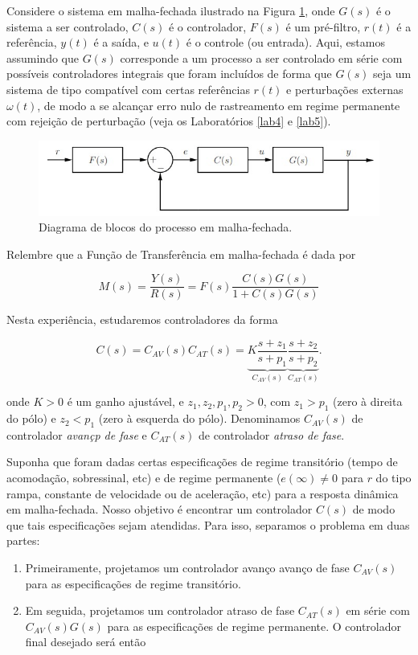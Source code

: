 \documentclass[
]{book}
\providecommand{\tightlist}{%
  \setlength{\itemsep}{0pt}\setlength{\parskip}{0pt}}
\theoremstyle{definition}
\theoremstyle{definition}
\theoremstyle{definition}
\theoremstyle{remark}
\begin{document}
Considere o sistema em malha-fechada ilustrado na Figura \ref{fig:fig9A1}, onde \(G(s)\) é o sistema a ser controlado, \(C(s)\) é o controlador, \(F(s)\) é um pré-filtro, \(r(t)\) é a referência, \(y(t)\) é a saída, e \(u(t)\) é o controle (ou entrada). Aqui, estamos assumindo que \(G(s)\) corresponde a um processo a ser controlado em série com possíveis controladores integrais que foram incluídos de forma que \(G(s)\) seja um sistema de tipo compatível com certas referências \(r(t)\) e perturbações externas \(\omega (t)\), de modo a se alcançar erro nulo de rastreamento em regime permanente com rejeição de perturbação (veja os Laboratórios \ref{lab4} e \ref{lab5}).

\begin{figure}

{\centering \includegraphics[width=0.5\linewidth]{Imagens/Lab9/Apresentação/fig1} 

}

\caption{Diagrama de blocos do processo em malha-fechada.}\label{fig:fig9A1}
\end{figure}

Relembre que a Função de Transferência em malha-fechada é dada por

\[
M(s) = \frac{Y(s)}{R(s)} = F(s)\frac{C(s)G(s)}{1+C(s)G(s)}
\]

Nesta experiência, estudaremos controladores da forma

\[
C(s) = C_{AV}(s)C_{AT}(s) = \underbrace{K\frac{s+z_1}{s+p_1}}_{C_{AV}(s)} \underbrace{\frac{s+z_2}{s+p_2}}_{C_{AT}(s)}.
\]

onde \(K>0\) é um ganho ajustável, e \(z_1,z_2,p_1,p_2 >0\), com \(z_1>p_1\) (zero à direita do pólo) e \(z_2<p_1\) (zero à esquerda do pólo). Denominamos \(C_{AV}(s)\) de controlador \emph{avançp de fase} e \(C_{AT}(s)\) de controlador \emph{atraso de fase}.

Suponha que foram dadas certas especificações de regime transitório (tempo de acomodação, sobressinal, etc) e de regime permanente (\(e(\infty) \neq 0\) para \(r\) do tipo rampa, constante de velocidade ou de aceleração, etc) para a resposta dinâmica em malha-fechada. Nosso objetivo é encontrar um controlador \(C(s)\) de modo que tais especificações sejam atendidas. Para isso, separamos o problema em duas partes:

\begin{enumerate}
\def\labelenumi{\arabic{enumi}.}
\tightlist
\item
  Primeiramente, projetamos um controlador avanço avanço de fase \(C_{AV}(s)\) para as especificações de regime transitório.
\item
  Em seguida, projetamos um controlador atraso de fase \(C_{AT}(s)\) em série com \(C_{AV}(s)G(s)\) para as especificações de regime permanente. O controlador final desejado será então
\end{enumerate}
\end{document}
